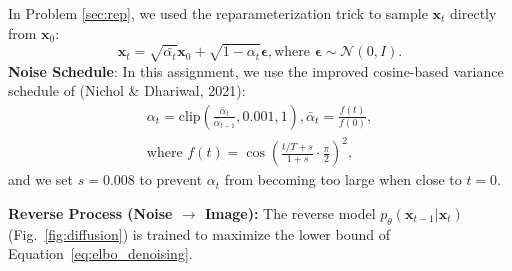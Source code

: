 \documentclass[11pt,addpoints,answers]{exam}
\newcommand{\xv}{\mathbf{x}}
\newcommand{\epsilonv   }{\boldsymbol \epsilon   }
\begin{document}
\begin{questions}
    In Problem \ref{sec:rep}, we used the reparameterization trick to sample \( \xv_t \) directly from \(\xv_0 \):
    \begin{equation}
        \xv_t = \sqrt{\bar{\alpha_t}}\xv_0 + \sqrt{1 - \alpha_t} \epsilonv, \text{where } \epsilonv \sim \mathcal{N}(0,I).
        \label{eq:xt}
    \end{equation}
    \textbf{Noise Schedule}: In this assignment, we use the improved cosine-based variance schedule of (Nichol \& Dhariwal, 2021):
    \begin{equation}
        \begin{aligned}
            \alpha_t = \text{clip}\left(\frac{\bar{\alpha}_t}{\bar\alpha_{t-1}}, 0.001, 1\right), \bar{\alpha}_t = \frac{f(t)}{f(0)}, \\
            \text{where } f(t) = \cos\left(\frac{t/T + s}{1 + s} \cdot \frac{\pi}{2}\right)^2,
        \end{aligned}
    \end{equation}
    and we set $s=0.008$ to prevent $\alpha_t$ from becoming too large when close to $t = 0$.
    
    \textbf{Reverse Process (Noise $\rightarrow$ Image):} The reverse model $p_\theta(\xv_{t-1}|\xv_t)$ (Fig.~\ref{fig:diffusion}) is trained to maximize the lower bound of Equation~\ref{eq:elbo_denoising}.
    

\end{questions}
\end{document}
